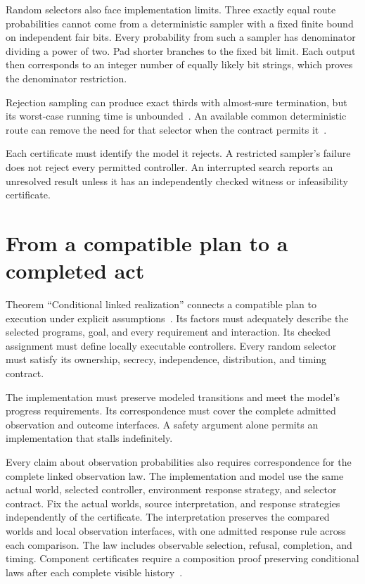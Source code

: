 \documentclass{momentum}
\begin{document}
Random selectors also face implementation limits.
Three exactly equal route probabilities cannot come from a deterministic sampler with a fixed finite bound on independent fair bits.
Every probability from such a sampler has denominator dividing a power of two.
Pad shorter branches to the fixed bit limit.
Each output then corresponds to an integer number of equally likely bit strings, which proves the denominator restriction.

Rejection sampling can produce exact thirds with almost-sure termination, but its worst-case running time is unbounded~\cite[Section~18]{linking}.
An available common deterministic route can remove the need for that selector when the contract permits it~\cite[Section~23]{linking}.

Each certificate must identify the model it rejects.
A restricted sampler's failure does not reject every permitted controller.
An interrupted search reports an unresolved result unless it has an independently checked witness or infeasibility certificate.

\section{From a compatible plan to a completed act}
\label{sec:realization}

Theorem ``Conditional linked realization'' connects a compatible plan to execution under explicit assumptions~\cite[Section~25]{linking}.
Its factors must adequately describe the selected programs, goal, and every requirement and interaction.
Its checked assignment must define locally executable controllers.
Every random selector must satisfy its ownership, secrecy, independence, distribution, and timing contract.

The implementation must preserve modeled transitions and meet the model's progress requirements.
Its correspondence must cover the complete admitted observation and outcome interfaces.
A safety argument alone permits an implementation that stalls indefinitely.

Every claim about observation probabilities also requires correspondence for the complete linked observation law.
The implementation and model use the same actual world, selected controller, environment response strategy, and selector contract.
Fix the actual worlds, source interpretation, and response strategies independently of the certificate.
The interpretation preserves the compared worlds and local observation interfaces, with one admitted response rule across each comparison.
The law includes observable selection, refusal, completion, and timing.
Component certificates require a composition proof preserving conditional laws after each complete visible history~\cite[Section~25]{linking}.
\end{document}
